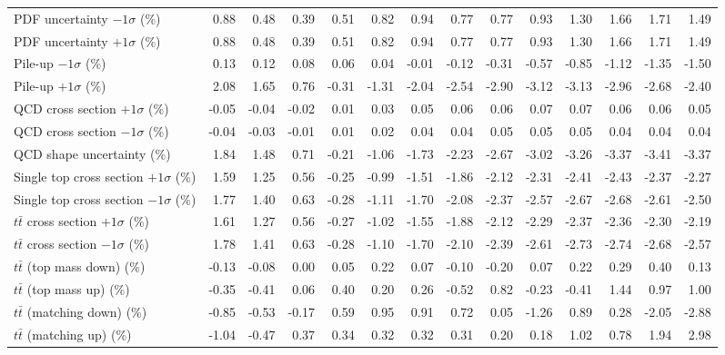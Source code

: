 \begin{table}[htbp]
{\begin{tabular}{lrrrrrrrrrrrrr}
PDF uncertainty $-1\sigma$ (\%) & 0.88 & 0.48 & 0.39 & 0.51 & 0.82 & 0.94 & 0.77 & 0.77 & 0.93 & 1.30 & 1.66 & 1.71 & 1.49 \\ 
PDF uncertainty $+1\sigma$ (\%) & 0.88 & 0.48 & 0.39 & 0.51 & 0.82 & 0.94 & 0.77 & 0.77 & 0.93 & 1.30 & 1.66 & 1.71 & 1.49 \\ 
Pile-up $-1\sigma$ (\%) & 0.13 & 0.12 & 0.08 & 0.06 & 0.04 & -0.01 & -0.12 & -0.31 & -0.57 & -0.85 & -1.12 & -1.35 & -1.50 \\ 
Pile-up $+1\sigma$ (\%) & 2.08 & 1.65 & 0.76 & -0.31 & -1.31 & -2.04 & -2.54 & -2.90 & -3.12 & -3.13 & -2.96 & -2.68 & -2.40 \\ 
QCD cross section \ensuremath{+1\sigma} (\%) & -0.05 & -0.04 & -0.02 & 0.01 & 0.03 & 0.05 & 0.06 & 0.06 & 0.07 & 0.07 & 0.06 & 0.06 & 0.05 \\ 
QCD cross section \ensuremath{-1\sigma} (\%) & -0.04 & -0.03 & -0.01 & 0.01 & 0.02 & 0.04 & 0.04 & 0.05 & 0.05 & 0.05 & 0.04 & 0.04 & 0.04 \\ 
QCD shape uncertainty (\%) & 1.84 & 1.48 & 0.71 & -0.21 & -1.06 & -1.73 & -2.23 & -2.67 & -3.02 & -3.26 & -3.37 & -3.41 & -3.37 \\ 
Single top cross section $+1\sigma$ (\%) & 1.59 & 1.25 & 0.56 & -0.25 & -0.99 & -1.51 & -1.86 & -2.12 & -2.31 & -2.41 & -2.43 & -2.37 & -2.27 \\ 
Single top cross section $-1\sigma$ (\%) & 1.77 & 1.40 & 0.63 & -0.28 & -1.11 & -1.70 & -2.08 & -2.37 & -2.57 & -2.67 & -2.68 & -2.61 & -2.50 \\ 
$t\bar{t}$ cross section $+1\sigma$ (\%) & 1.61 & 1.27 & 0.56 & -0.27 & -1.02 & -1.55 & -1.88 & -2.12 & -2.29 & -2.37 & -2.36 & -2.30 & -2.19 \\ 
$t\bar{t}$ cross section $-1\sigma$ (\%) & 1.78 & 1.41 & 0.63 & -0.28 & -1.10 & -1.70 & -2.10 & -2.39 & -2.61 & -2.73 & -2.74 & -2.68 & -2.57 \\ 
$t\bar{t}$ (top mass down) (\%) & -0.13 & -0.08 & 0.00 & 0.05 & 0.22 & 0.07 & -0.10 & -0.20 & 0.07 & 0.22 & 0.29 & 0.40 & 0.13 \\ 
$t\bar{t}$ (top mass up) (\%) & -0.35 & -0.41 & 0.06 & 0.40 & 0.20 & 0.26 & -0.52 & 0.82 & -0.23 & -0.41 & 1.44 & 0.97 & 1.00 \\ 
$t\bar{t}$ (matching down) (\%) & -0.85 & -0.53 & -0.17 & 0.59 & 0.95 & 0.91 & 0.72 & 0.05 & -1.26 & 0.89 & 0.28 & -2.05 & -2.88 \\ 
$t\bar{t}$ (matching up) (\%) & -1.04 & -0.47 & 0.37 & 0.34 & 0.32 & 0.32 & 0.31 & 0.20 & 0.18 & 1.02 & 0.78 & 1.94 & 2.98 \\ 

\end{tabular}}
\end{table}
